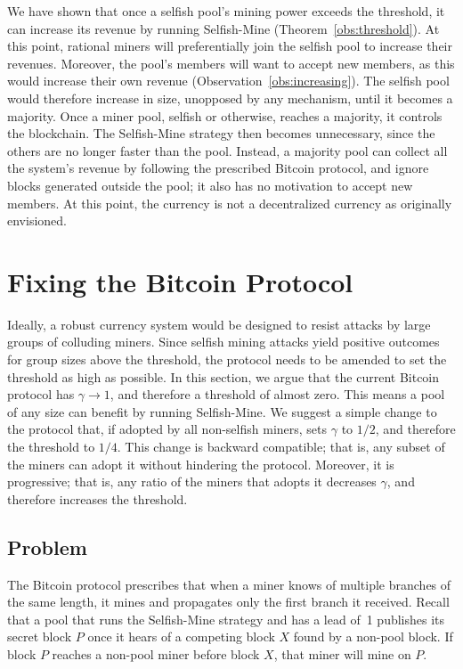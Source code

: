 \documentclass[letterpaper]{llncs}
\newcommand{\negspace}{\vspace{-0.5\baselineskip}}
\begin{document}
We have shown that once a selfish pool's mining power exceeds the threshold, it can increase its revenue by running Selfish-Mine (Theorem~\ref{obs:threshold}). 
At this point, rational miners will preferentially join the selfish pool to increase their revenues. 
Moreover, the pool's members will want to accept new members, as this would increase their own revenue (Observation~\ref{obs:increasing}). 
The selfish pool would therefore increase in size, unopposed by any mechanism, until it becomes a majority. 
Once a miner pool, selfish or otherwise, reaches a majority, it controls the blockchain. 
The Selfish-Mine strategy then becomes unnecessary, since the others are no longer faster than the pool.
Instead, a majority pool can collect all the system's revenue by following the prescribed Bitcoin protocol, and ignore blocks generated outside the pool; it also has no motivation to accept new members. 
At this point, the currency is not a decentralized currency as originally envisioned. 



    \section{Fixing the Bitcoin Protocol} \label{sec:btcPatch} 
    
Ideally, a robust currency system would be designed to resist attacks by large groups of colluding miners. Since selfish mining attacks yield positive outcomes for group sizes above the threshold, the protocol needs to be amended to set the threshold as high as possible. In this section, we argue that the current Bitcoin protocol has $\gamma \rightarrow 1$, and therefore a threshold of almost zero.
This means a pool of any size can benefit by running Selfish-Mine. We suggest a simple change to the protocol that, if adopted by all non-selfish miners, sets $\gamma$ to $1/2$, and therefore the threshold to $1/4$. This change is backward compatible; that is, any subset of the miners can adopt it without hindering the protocol. Moreover, it is progressive; that is, any ratio of the miners that adopts it decreases $\gamma$, and therefore increases the threshold. 

        \subsection{Problem}
        \negspace

The Bitcoin protocol prescribes that when a miner knows of multiple branches of the same length, it mines and propagates only the first branch it received. 
Recall that a pool that runs the Selfish-Mine strategy and has a lead of~1 publishes its secret block $P$ once it hears of a competing block $X$ found by a non-pool block. If block $P$ reaches a non-pool miner before block $X$, that miner will mine on $P$.  
\end{document}
